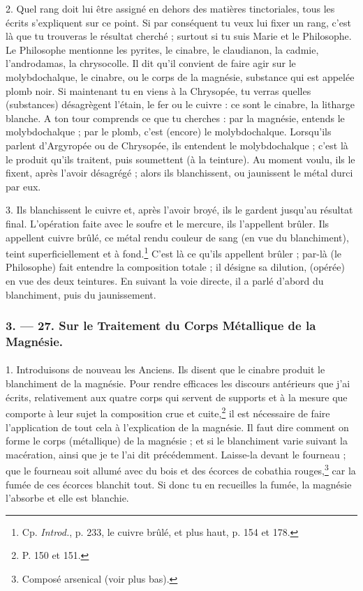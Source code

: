 \documentclass[landscape, a4paper, 11pt, oneside, polutonikogreek, french]{article}
\begin{document}
2. Quel rang doit lui être assigné en dehors des matières tinctoriales, tous les écrits s'expliquent sur ce point. Si par conséquent tu veux lui fixer un rang, c'est là que tu trouveras le résultat cherché ; surtout si tu suis Marie et le Philosophe. Le Philosophe mentionne les pyrites, le cinabre, le claudianon, la cadmie, l'androdamas, la chrysocolle. Il dit qu'il convient de faire agir sur le molybdochalque, le cinabre, ou le corps de la magnésie, substance qui est appelée plomb noir. Si maintenant tu en viens à la Chrysopée, tu verras quelles (substances) désagrègent l'étain, le fer ou le cuivre : ce sont le cinabre, la litharge blanche. A ton tour comprends ce que tu cherches : par la magnésie, entends le molybdochalque ; par le plomb, c'est (encore) le molybdochalque. Lorsqu'ils parlent d'Argyropée ou de Chrysopée, ils entendent le molybdochalque ; c'est là le produit qu'ils traitent, puis soumettent (à la teinture). Au moment voulu, ils le fixent, après l'avoir désagrégé ; alors ils blanchissent, ou jaunissent le métal durci par eux.

3. Ils blanchissent le cuivre et, après l'avoir broyé, ils le gardent jusqu'au résultat final. L'opération faite avec le soufre et le mercure, ils l'appellent brûler. Ils appellent cuivre brûlé, ce métal rendu couleur de sang (en vue du blanchiment), teint superficiellement et à fond.\footnote{Cp. \emph{Introd.}, p. 233, le cuivre brûlé, et plus haut, p. 154 et 178.} C'est là ce qu'ils appellent brûler ; par-là (le Philosophe) fait entendre la composition totale ; il désigne sa dilution, (opérée) en vue des deux teintures. En suivant la voie directe, il a parlé d'abord du blanchiment, puis du jaunissement.

\bigskip
\centerline{\EightStarTaper}
\centerline{\EightStarTaper\EightStarTaper}
\bigskip

\subsubsection{3. --- 27. Sur le Traitement du Corps Métallique de la Magnésie.}
\paragraph{}
1. Introduisons de nouveau les Anciens. Ils disent que le cinabre produit le blanchiment de la magnésie. Pour rendre efficaces les discours antérieurs que j'ai écrits, relativement aux quatre corps qui servent de supports et à la mesure que comporte à leur sujet la composition crue et cuite,\footnote{P. 150 et 151.} il est nécessaire de faire l'application de tout cela à l'explication de la magnésie. Il faut dire comment on forme le corps (métallique) de la magnésie ; et si le blanchiment varie suivant la macération, ainsi que je te l'ai dit précédemment. Laisse-la devant le fourneau ; que le fourneau soit allumé avec du bois et des écorces de cobathia rouges,\footnote{Composé arsenical (voir plus bas).} car la fumée de ces écorces blanchit tout. Si donc tu en recueilles la fumée, la magnésie l'absorbe et elle est blanchie.
\end{document}
